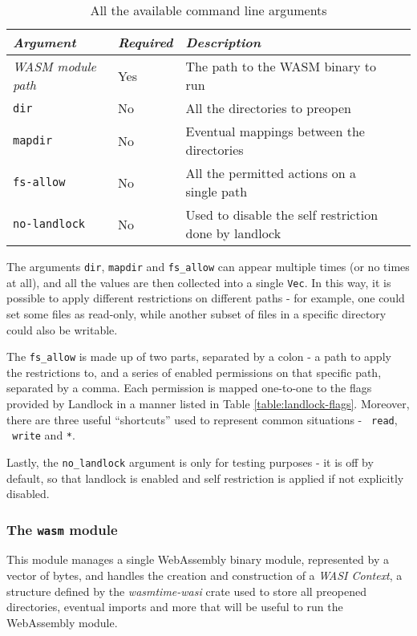 \begin{table}
  \centering
  \begin{tabular}{|l|l|l|l|}
    \hline
    \textit{Argument} & \textit{Required} & \textit{Description} \\
    \hline\hline
    \textit{WASM module path} & Yes & The path to the WASM binary to run \\ \hline
    \texttt{dir} & No & All the directories to preopen \\ \hline
    \texttt{mapdir} & No & Eventual mappings between the directories \\ \hline
    \texttt{fs-allow} & No & All the permitted actions on a single path \\ \hline
    \texttt{no-landlock} & No & Used to disable the self restriction done by landlock \\
    \hline
  \end{tabular}
  \caption{All the available command line arguments}
  \label{table:landlock-cli-args}
\end{table}

The arguments \texttt{dir}, \texttt{mapdir} and \texttt{fs\_allow} can appear multiple times (or no times at all), and all the values
are then collected into a single \texttt{Vec}. In this way, it is possible to apply different restrictions on different
paths - for example, one could set some files as read-only, while another subset of files in a specific directory
could also be writable.

The \texttt{fs\_allow} is made up of two parts, separated by a colon - a path to apply the restrictions to,
and a series of enabled permissions on that specific path, separated by a comma.
Each permission is mapped one-to-one to the flags provided by Landlock in a manner listed in Table \ref{table:landlock-flags}.
Moreover, there are three useful ``shortcuts'' used to represent common situations - \texttt{~read}, \texttt{~write} and \texttt{*}.

Lastly, the \texttt{no\_landlock} argument is only for testing purposes - it is off by default, so that
landlock is enabled and self restriction is applied if not explicitly disabled.

\subsubsection{The \texttt{wasm} module}

This module manages a single WebAssembly binary module, represented by a vector of bytes, and handles the creation
and construction of a \textit{WASI Context}, a structure defined by the \textit{wasmtime-wasi} crate used to store
all preopened directories, eventual imports and more that will be useful to run the WebAssembly module.

